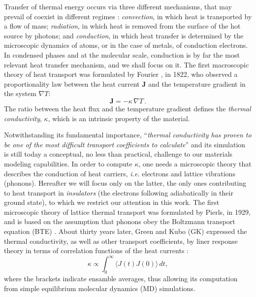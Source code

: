 Transfer of thermal energy occurs via three different mechanisms, that may prevail of coexist in different regimes \cite{Lienhard2017}: \emph{convection}, in which heat is transported by a flow of mass; \emph{radiation}, in which heat is removed from the surface of the hot source by photons; and \emph{conduction}, in which heat transfer is determined by the microscopic dynamics of atoms, or in the case of metals, of conduction electrons. 
In condensed phases and at the molecular scale, conduction is by far the most relevant heat transfer mechanism, and we shall focus on it. 
The first macroscopic theory of heat transport was formulated by Fourier \cite{Fourier1878}, in 1822, who observed a proportionality law between the heat current $\mathbf{J}$ and the temperature gradient in the system $\nabla T$:
\begin{equation}
    \mathbf{J} = -\kappa\, \nabla T \,.  \label{eq:Fourier-law}
\end{equation}
The ratio between the heat flux and the temperature gradient defines the \emph{thermal conductivity}, $\kappa$, which is an intrinsic property of the material. 

Notwithstanding its fundamental importance, ``\emph{thermal conductivity has proven to be one of the most difficult transport coefficients to calculate}'' \cite{Evans1990} and its simulation is still today a conceptual, no less than practical, challenge to our materials modeling capabilities. 
In order to compute $\kappa$, one needs a microscopic theory that describes the conduction of heat carriers, \emph{i.e.} electrons and lattice vibrations (phonons). Hereafter we will focus only on the latter, the only ones contributing to heat transport in \emph{insulators} (the electrons following adiabatically in their ground state), to which we restrict our attention in this work. 
The first microscopic theory of lattice thermal transport was formulated by Pierls, in 1929, and is based on the assumption that phonons obey the Boltzmann transport equation (BTE) \cite{Peierls1929}. 
About thirty years later, Green and Kubo (GK) expressed the thermal conductivity, as well as other transport coefficients, by liner response theory in terms of correlation functions of the heat currents \cite{Green1952,Green1954,Kubo1957a,Kubo1957b,Zwanzig1965}:
\begin{equation}
    \kappa \propto \int_{0}^{\infty}\!\langle{J}(t){J}(0)\rangle\, dt, \label{eq:GK-intro}
\end{equation}
where the brackets indicate ensamble averages, thus allowing its computation from simple equilibrium molecular dynamics (MD) simulations. 

